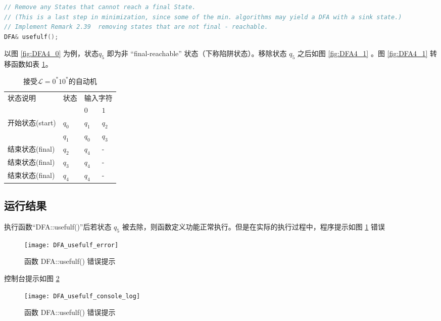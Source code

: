 \begin{lstlisting}[language=C++,label={lst:usefulf},caption={DFA::usefulf()}]
// Remove any States that cannot reach a final State.
// (This is a last step in minimization, since some of the min. algorithms may yield a DFA with a sink state.)
// Implement Remark 2.39  removing states that are not final - reachable.
DFA& usefulf();
\end{lstlisting}
以图 \ref{fig:DFA4_0} 为例，状态$q_5$ 即为非 “final-reachable” 状态（下称陷阱状态）。移除状态 $q_5$ 之后如图 \ref{fig:DFA4_1} 。图 \ref{fig:DFA4_1} 转移函数如表 \ref{tab:DFA4_1}。

\begin{table}[!htbp]
    \caption{接受{$\mathcal{L}=0^*10^*$}的自动机{\cite{book1}}}
    \label{tab:DFA4_1}
    \centering
    \small%
    \setlength{\tabcolsep}{4pt}%
    \renewcommand{\arraystretch}{1.2}%
        \begin{tabular}{l p{4em}<{\centering} p{3em}<{\centering} p{3em}<{\centering}}
        \toprule %
        \multirow{2}{*}{状态说明} & \multirow{2}{*}{状态} & \multicolumn{2}{c}{输入字符} \\
		\cline{3-4}      &    &$0$ & $1$  \\
        \midrule%
        开始状态(start)  & $q_0$ & $q_1$   & $q_2$   \\
                        & $q_1$ & $q_0$   & $q_3$   \\
        结束状态(final) & $q_2$ & $q_4$   & -   \\
        结束状态(final) & $q_3$ & $q_4$   & -   \\
        结束状态(final) & $q_4$ & $q_4$   & -   \\
        \bottomrule%
    \end{tabular}
\end{table}

\subsection{运行结果}

执行函数“DFA::usefulf()”后若状态 $q_5$ 被去除，则函数定义功能正常执行。但是在实际的执行过程中，程序提示如图 \ref{fig::usefulf_error} 错误 

\begin{figure}[!htbp]
    \centering
    \texttt{[image: DFA\_usefulf\_error]}
    \caption{函数 DFA::usefulf() 错误提示}
    \label{fig::usefulf_error}
\end{figure}
控制台提示如图 \ref{fig::usefulf_console_log}
\begin{figure}[!htbp]
    \centering
    \texttt{[image: DFA\_usefulf\_console\_log]}
    \caption{函数 DFA::usefulf() 错误提示}
    \label{fig::usefulf_console_log}
\end{figure}

